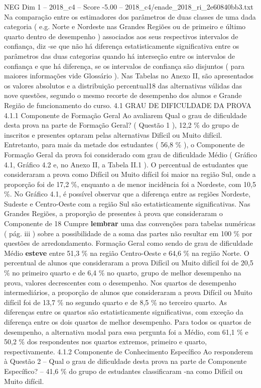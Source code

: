 \begin{textsample}{NEG Dim 1 – 2018\_c4 – Score -5.00 – 2018\_c4/enade\_2018\_ri\_2e60840bb3.txt}
Na comparação entre os estimadores dos parâmetros de duas classes de uma dada categoria ( e.g.
Norte e Nordeste nas Grandes Regiões ou de primeiro e último quarto dentro de desempenho ) associados aos seus respectivos intervalos de confiança, diz -se que não há diferença estatisticamente significativa entre os parâmetros das duas categorias quando há interseção entre os intervalos de confiança e que há diferença, se os intervalos de confiança são disjuntos ( para maiores informações vide Glossário ).
Nas Tabelas no Anexo II, são apresentados os valores absolutos e a distribuição percentual18 das alternativas válidas das nove questões, segundo o mesmo recorte de desempenho dos alunos e Grande Região de funcionamento do curso. 4.1 GRAU DE DIFICULDADE DA PROVA 4.1.1 Componente de Formação Geral Ao avaliarem Qual o grau de dificuldade desta prova na parte de Formação Geral? ( Questão 1 ), 12,2 \% do grupo de inscritos e presentes optaram pelas alternativas Difícil ou Muito difícil.
Entretanto, para mais da metade dos estudantes ( 56,8 \% ), o Componente de Formação Geral da prova foi considerado com grau de dificuldade Médio ( Gráfico 4.1, Gráfico 4.2 e, no Anexo II, a Tabela II.1 ).
O percentual de estudantes que consideraram a prova como Difícil ou Muito difícil foi maior na região Sul, onde a proporção foi de 17,2 \%, enquanto a de menor incidência foi a Nordeste, com 10,5 \%.
No Gráfico 4.1, é possível observar que a diferença entre as regiões Nordeste, Sudeste e Centro-Oeste com a região Sul são estatisticamente significativas.
Nas Grandes Regiões, a proporção de presentes à prova que consideraram o Componente de 18 Cumpre \textbf{lembrar} uma das convenções para tabelas numéricas ( pág. iii ) sobre a possibilidade de a soma das partes não resultar em 100 \% por questões de arredondamento.
Formação Geral como sendo de grau de dificuldade Médio \textbf{esteve} entre 51,3 \% na região Centro-Oeste e 64,6 \% na região Norte.
O percentual de alunos que consideraram a prova Difícil ou Muito difícil foi de 20,5 \% no primeiro quarto e de 6,4 \% no quarto, grupo de melhor desempenho na prova, valores decrescentes com o desempenho.
Nos quartos de desempenho intermediários, a proporção de alunos que consideraram a prova Difícil ou Muito difícil foi de 13,7 \% no segundo quarto e de 8,5 \% no terceiro quarto.
As diferenças entre os quartos são estatisticamente significativas, com exceção da diferença entre os dois quartos de melhor desempenho.
Para todos os quartos de desempenho, a alternativa modal para essa pergunta foi a Médio, com 61,1 \% e 50,2 \% dos respondentes nos quartos extremos, primeiro e quarto, respectivamente. 4.1.2 Componente de Conhecimento Específico Ao responderem à Questão 2 – Qual o grau de dificuldade desta prova na parte de Componente Específico? – 41,6 \% do grupo de estudantes classificaram -na como Difícil ou Muito difícil.

\end{textsample}
